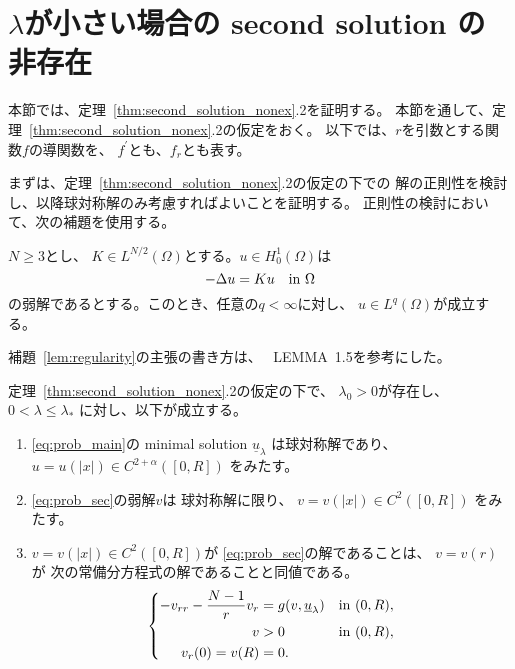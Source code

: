 \section{$\lambda$が小さい場合の second solution の非存在}
\label{sec:sym}

本節では、定理~\ref{thm:second_solution_nonex}.2を証明する。
本節を通して、定理~\ref{thm:second_solution_nonex}.2の仮定をおく。
以下では、$r$を引数とする関数$f$の導関数を、
$f^\prime$とも、$f_r$とも表す。

まずは、定理~\ref{thm:second_solution_nonex}.2の仮定の下での
解の正則性を検討し、以降球対称解のみ考慮すればよいことを証明する。
正則性の検討において、次の補題を使用する。

\begin{lem}[\cite{MR539217}] 
 \label{lem:regularity}
 $N \geq 3$とし、
 $K \in L^{N/2}(\Omega)$とする。$u \in H_0^1(\Omega)$は
 \[
  - \Delta u = K u \ \ ~\text{in}~ \Omega
 \]
 の弱解であるとする。このとき、任意の$q < \infty$に対し、
 $u \in L^q(\Omega)$が成立する。
\end{lem}

補題~\ref{lem:regularity}の主張の書き方は、
\cite{MR709644}~LEMMA~1.5を参考にした。

\begin{lem} \label{lem:reg_rad}
 定理~\ref{thm:second_solution_nonex}.2の仮定の下で、
 $\lambda_0 > 0$が存在し、$0 < \lambda \leq \lambda_*$
 に対し、以下が成立する。
 \begin{enumerate}[1.] \sage
  \item \ref{eq:prob_main}の minimal solution $\underline{u}_\lambda$
        は球対称解であり、
        $u = u(\lvert x \rvert)
        \in C^{2+\alpha}([0, R])$
        をみたす。
  \item \ref{eq:prob_sec}の弱解$v$は
        球対称解に限り、
        $v = v(\lvert x \rvert)
        \in C^2([0, R])$
        をみたす。
  \item $v = v(\lvert x \rvert) \in C^2([0, R])$が
        \ref{eq:prob_sec}の解であることは、
        $v = v(r)$が
        次の常備分方程式の解であることと同値である。
        \begin{align}
         \left\{
          \begin{aligned}
           -v_{rr} - \frac{N-1}{r}v_r  &= g(v, \underline{u}_\lambda)
           & &\text{in}~ (0, R),  \\
           v &> 0 & &\text{in}~ (0, R), \\
           v_r(0) = v(R) &= 0.  & &
          \end{aligned}
         \right. \label{eq:prob_rad}
        \end{align}
 \end{enumerate}
\end{lem}


